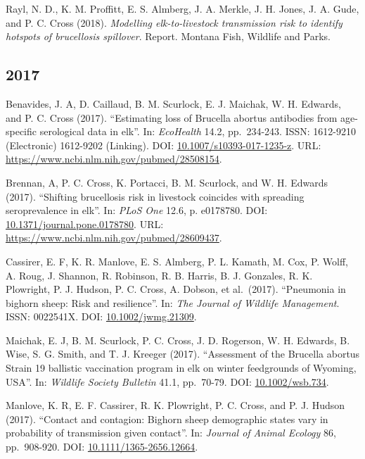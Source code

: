 \documentclass[12pt,]{article}
\begin{document}
Rayl, N. D., K. M. Proffitt, E. S. Almberg, J. A. Merkle, J. H. Jones,
J. A. Gude, and P. C. Cross (2018). \emph{Modelling elk-to-livestock
transmission risk to identify hotspots of brucellosis spillover}.
Report. Montana Fish, Wildlife and Parks.

\hypertarget{section-2}{%
\subsection{2017}\label{section-2}}

Benavides, J. A, D. Caillaud, B. M. Scurlock, E. J. Maichak, W. H.
Edwards, and P. C. Cross (2017). ``Estimating loss of Brucella abortus
antibodies from age-specific serological data in elk''. In:
\emph{EcoHealth} 14.2, pp.~234-243. ISSN: 1612-9210 (Electronic)
1612-9202 (Linking). DOI:
\href{https://doi.org/10.1007\%2Fs10393-017-1235-z}{10.1007/s10393-017-1235-z}.
URL: \url{https://www.ncbi.nlm.nih.gov/pubmed/28508154}.

Brennan, A, P. C. Cross, K. Portacci, B. M. Scurlock, and W. H. Edwards
(2017). ``Shifting brucellosis risk in livestock coincides with
spreading seroprevalence in elk''. In: \emph{PLoS One} 12.6, p.
e0178780. DOI:
\href{https://doi.org/10.1371\%2Fjournal.pone.0178780}{10.1371/journal.pone.0178780}.
URL: \url{https://www.ncbi.nlm.nih.gov/pubmed/28609437}.

Cassirer, E. F, K. R. Manlove, E. S. Almberg, P. L. Kamath, M. Cox, P.
Wolff, A. Roug, J. Shannon, R. Robinson, R. B. Harris, B. J. Gonzales,
R. K. Plowright, P. J. Hudson, P. C. Cross, A. Dobson, et al.~(2017).
``Pneumonia in bighorn sheep: Risk and resilience''. In: \emph{The
Journal of Wildlife Management}. ISSN: 0022541X. DOI:
\href{https://doi.org/10.1002\%2Fjwmg.21309}{10.1002/jwmg.21309}.

Maichak, E. J, B. M. Scurlock, P. C. Cross, J. D. Rogerson, W. H.
Edwards, B. Wise, S. G. Smith, and T. J. Kreeger (2017). ``Assessment of
the Brucella abortus Strain 19 ballistic vaccination program in elk on
winter feedgrounds of Wyoming, USA''. In: \emph{Wildlife Society
Bulletin} 41.1, pp.~70-79. DOI:
\href{https://doi.org/10.1002\%2Fwsb.734}{10.1002/wsb.734}.

Manlove, K. R, E. F. Cassirer, R. K. Plowright, P. C. Cross, and P. J.
Hudson (2017). ``Contact and contagion: Bighorn sheep demographic states
vary in probability of transmission given contact''. In: \emph{Journal
of Animal Ecology} 86, pp.~908-920. DOI:
\href{https://doi.org/10.1111\%2F1365-2656.12664}{10.1111/1365-2656.12664}.
\end{document}
